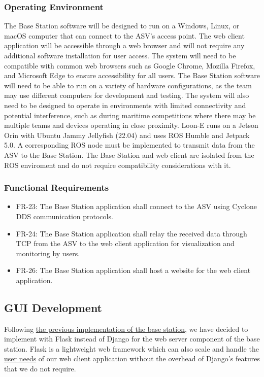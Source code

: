 \subsubsection{Operating Environment}
The Base Station software will be designed to run on a Windows, Linux, or macOS computer that can connect to the ASV's access point. 
The web client application will be accessible through a web browser and will not require any additional software installation for user access. The system will need to be compatible with common web browsers such as Google Chrome, Mozilla Firefox, and Microsoft Edge to ensure accessibility for all users. The Base Station software will need to be able to run on a variety of hardware configurations, as the team may use different computers for development and testing. The system will also need to be designed to operate in environments with limited connectivity and potential interference, such as during maritime competitions where there may be multiple teams and devices operating in close proximity.
Loon-E runs on a Jetson Orin with Ubuntu Jammy Jellyfish (22.04) and uses ROS Humble and Jetpack 5.0. A corresponding ROS node must be implemented to transmit data from the ASV to the Base Station. The Base Station and web client are isolated from the ROS enviroment and do not require compatibility considerations with it.

\subsubsection{Functional Requirements}
\begin{itemize}
    \item FR-23: The Base Station application shall connect to the ASV using Cyclone DDS communication protocols.
    \item FR-24: The Base Station application shall relay the received data through TCP from the ASV to the web client application for visualization and monitoring by users.
    \item FR-26: The Base Station application shall host a website for the web client application.
\end{itemize}


\subsection{GUI Development}

Following \hyperref[sec:basestation-previous-implementation]{the previous implementation of the base station}, we have decided to implement with Flask instead of Django for the web server component of the base station.
Flask is a lightweight web framework\autocite{FLASK} which can also scale and handle the \hyperref[sec:basestation-user-needs]{user needs} of our web client application without the overhead of Django's features that we do not require.

